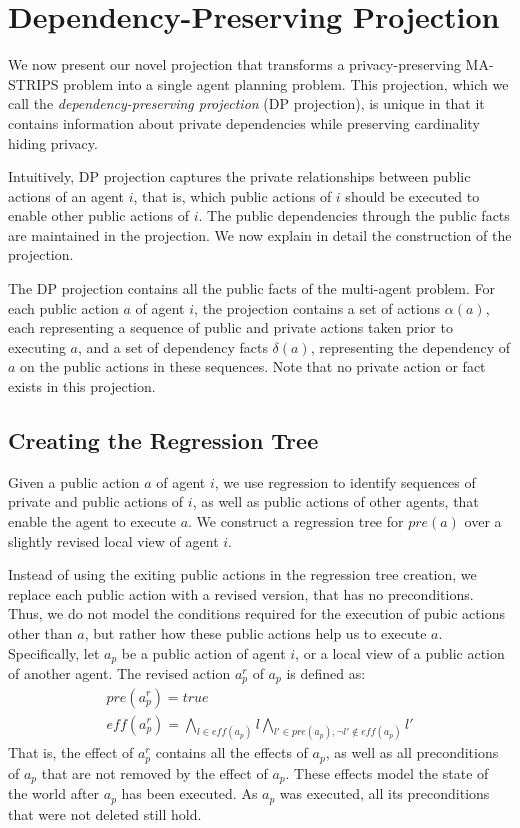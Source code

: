 \documentclass[letterpaper]{article}
\theoremstyle{definition}
\begin{document}
\section{Dependency-Preserving Projection}

We now present our novel projection that transforms a privacy-preserving MA-STRIPS problem into a single agent planning problem. This projection, which we call the {\em dependency-preserving projection} (DP projection), is unique in that it contains information about private dependencies while preserving cardinality hiding privacy. 


Intuitively, DP projection captures the private relationships between public actions of an agent $i$, that is, which public actions of $i$ should be executed to enable other public actions of $i$. The public dependencies through the public facts are maintained in the projection. We now explain in detail the construction of the projection.

The DP projection contains all the public facts of the multi-agent problem. For each public action $a$ of agent $i$, the projection contains a set of actions $\alpha(a)$, each representing a sequence of public and private actions taken prior to executing $a$,
and a set of dependency facts $\delta(a)$, representing the dependency of $a$ on the public actions in these sequences. 
Note that no private action or fact exists in this projection. 


\subsection{Creating the Regression Tree}


Given a public action $a$ of agent $i$, we use regression to identify sequences of private and public actions of $i$, as well as public actions of other agents, that enable the agent to execute $a$. We construct a regression tree for $pre(a)$ over a slightly revised local view of agent $i$.



Instead of using the exiting public actions in the regression tree creation, we replace each public action with a revised version, that has no preconditions. Thus, we do not model the conditions required for the execution of pubic actions other than $a$, but rather how these public actions help us to execute $a$.  Specifically, let $a_p$ be a public action of agent $i$, or a local view of a public action of another agent. The revised action $a^r_p$ of $a_p$ is defined as:
\begin{eqnarray}
&pre(a^r_p)=true&\\
&eff(a^r_p)=\displaystyle\bigwedge_{l \in eff(a_p)}l \bigwedge_{l' \in pre(a_p), \neg l' \not\in eff(a_p)}l'&
\end{eqnarray}
That is, the effect of $a^r_p$ contains all the effects of $a_p$, as well as all preconditions of $a_p$ that are not removed by the effect of $a_p$. These effects model the state of the world after $a_p$ has been executed. As $a_p$ was executed, all its preconditions that were not deleted still hold. 
\end{document}
